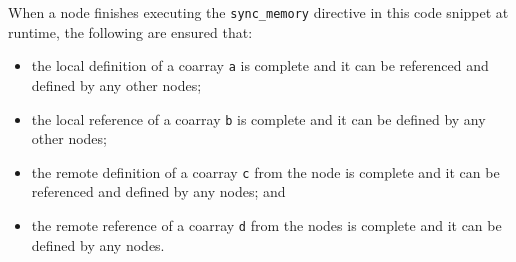 \vspace{0.5cm}

When a node finishes executing the {\tt sync\_memory} directive in this
code snippet at runtime, the following are ensured that:

\begin{itemize}
 \item the local definition of a coarray {\tt a} is complete
       and it can be referenced and defined by any other nodes;
 \item the local reference of a coarray {\tt b} is complete
       and it can be defined by any other nodes;
 \item the remote definition of a coarray {\tt c} from the node is
       complete and it can be referenced and defined by any nodes;
       and
 \item the remote reference of a coarray {\tt d} from the nodes is
       complete and it can be defined by any nodes.
\end{itemize}

%


%

